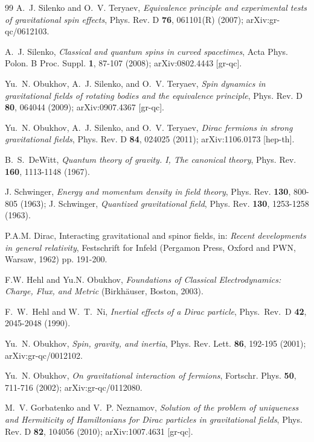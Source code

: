\documentclass[preprint,showpacs,preprintnumbers,eqsecnum,amsmath,amssymb]{revtex4-1}
\begin{document}
\begin{thebibliography}{99}
A.~J. Silenko and O.~V. Teryaev, {\it Equivalence principle and experimental
tests of gravitational spin effects},
Phys. Rev. D {\bf 76}, 061101(R) (2007); arXiv:gr-qc/0612103.

A.~J. Silenko,
{\it Classical and quantum spins in curved spacetimes},
Acta Phys. Polon. B Proc. Suppl. {\bf 1}, 87-107 (2008);
arXiv:0802.4443 [gr-qc].

Yu.~N. Obukhov, A.~J. Silenko, and O.~V. Teryaev,
{\it Spin dynamics in gravitational fields of rotating bodies
and the equivalence principle},
Phys. Rev. D {\bf 80}, 064044 (2009); arXiv:0907.4367 [gr-qc].

Yu.~N. Obukhov, A.~J. Silenko, and O.~V. Teryaev,
{\it Dirac fermions in strong gravitational fields},
Phys. Rev. D {\bf 84}, 024025 (2011); arXiv:1106.0173 [hep-th].

B.~S.~DeWitt, {\it Quantum theory of gravity. I, The canonical theory},
Phys. Rev. {\bf 160}, 1113-1148 (1967). %

J. Schwinger, {\it Energy and momentum density in field theory},
Phys. Rev. {\bf 130}, 800-805 (1963); %
J. Schwinger, {\it Quantized gravitational field},
Phys. Rev. {\bf 130}, 1253-1258 (1963). %

P.A.M. Dirac, Interacting gravitational and spinor fields,
in: {\sl Recent developments in general relativity}, Festschrift for Infeld
(Pergamon Press, Oxford and PWN, Warsaw, 1962) pp. 191-200.

F.W. Hehl and Yu.N. Obukhov, {\it Foundations of Classical Electrodynamics:
Charge, Flux, and Metric} (Birkh\"auser, Boston, 2003).

F.~W.~Hehl and W.~T.~Ni, {\it Inertial effects of a Dirac particle},
Phys.\ Rev.\ D {\bf 42}, 2045-2048 (1990).

Yu.~N. Obukhov, {\it Spin, gravity, and inertia},
Phys. Rev. Lett. {\bf 86}, 192-195 (2001); %
arXiv:gr-qc/0012102.

Yu.~N. Obukhov, {\it On gravitational interaction of fermions},
Fortschr. Phys. {\bf 50}, 711-716 (2002); %
arXiv:gr-qc/0112080.

M.~V. Gorbatenko and V.~P. Neznamov, {\it Solution of the problem of uniqueness
and Hermiticity of Hamiltonians for Dirac particles in gravitational fields},
Phys. Rev. D {\bf 82}, 104056 (2010); %
arXiv:1007.4631 [gr-qc].


\end{thebibliography}
\end{document}
